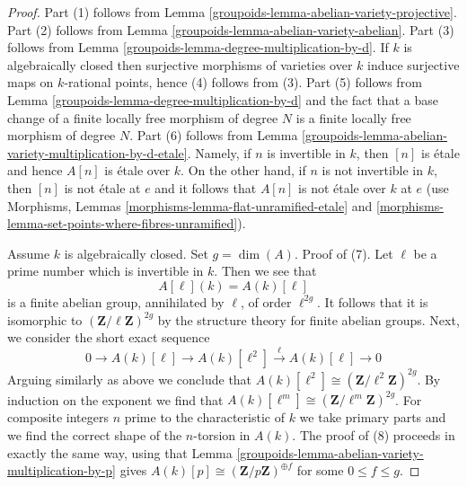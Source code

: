 \begin{proof}

Part (1) follows from Lemma \ref{groupoids-lemma-abelian-variety-projective}.
Part (2) follows from Lemma \ref{groupoids-lemma-abelian-variety-abelian}.
Part (3) follows from Lemma \ref{groupoids-lemma-degree-multiplication-by-d}.
If $k$ is algebraically closed then surjective morphisms of varieties
over $k$ induce surjective maps on $k$-rational points, hence
(4) follows from (3).
Part (5) follows from Lemma \ref{groupoids-lemma-degree-multiplication-by-d}
and the fact that a base change of a finite locally free morphism
of degree $N$ is a finite locally free morphism of degree $N$.
Part (6) follows from
Lemma \ref{groupoids-lemma-abelian-variety-multiplication-by-d-etale}.
Namely, if $n$ is invertible in $k$, then $[n]$ is \'etale
and hence $A[n]$ is \'etale over $k$.
On the other hand, if $n$ is not invertible in $k$, then
$[n]$ is not \'etale at $e$ and it follows that $A[n]$
is not \'etale over $k$ at $e$ (use
Morphisms, Lemmas \ref{morphisms-lemma-flat-unramified-etale} and
\ref{morphisms-lemma-set-points-where-fibres-unramified}).

\medskip\noindent
Assume $k$ is algebraically closed. Set $g = \dim(A)$. Proof of (7).
Let $\ell$ be a prime number which is invertible in $k$. Then we see that
$$
A[\ell](k) = A(k)[\ell]
$$
is a finite abelian group, annihilated by $\ell$, of order $\ell^{2g}$.
It follows that it is isomorphic to $(\mathbf{Z}/\ell\mathbf{Z})^{2g}$
by the structure theory for finite abelian groups. Next, we consider
the short exact sequence
$$
0 \to A(k)[\ell] \to A(k)[\ell^2] \xrightarrow{\ell} A(k)[\ell] \to 0
$$
Arguing similarly as above we conclude that
$A(k)[\ell^2] \cong (\mathbf{Z}/\ell^2\mathbf{Z})^{2g}$.
By induction on the exponent we find that
$A(k)[\ell^m] \cong (\mathbf{Z}/\ell^m\mathbf{Z})^{2g}$.
For composite integers $n$ prime to the characteristic of $k$
we take primary parts and we find the correct shape of the
$n$-torsion in $A(k)$.
The proof of (8) proceeds in exactly the same way, using that
Lemma \ref{groupoids-lemma-abelian-variety-multiplication-by-p} gives
$A(k)[p] \cong (\mathbf{Z}/p\mathbf{Z})^{\oplus f}$ for some $0 \leq f \leq g$.
\end{proof}

